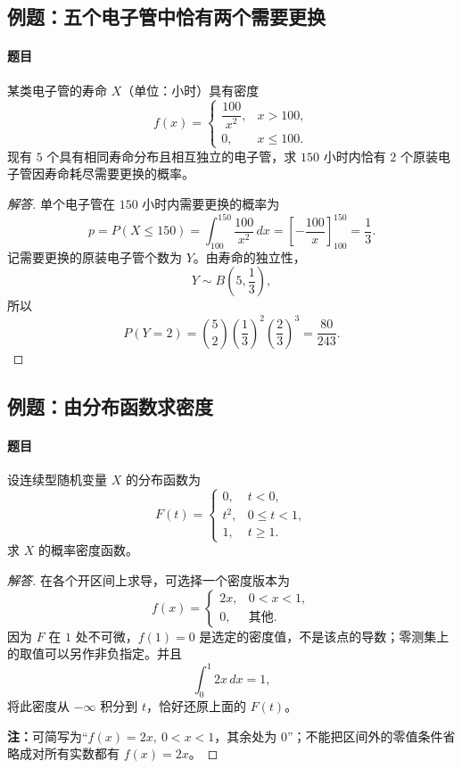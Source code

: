 \subsection{例题：五个电子管中恰有两个需要更换}\label{note:c2:e11}
\paragraph{题目}
某类电子管的寿命 $X$（单位：小时）具有密度
\[
f(x)=
\begin{cases}
\dfrac{100}{x^2},&x>100,\\[0.4em]
0,&x\leq100.
\end{cases}
\]
现有 $5$ 个具有相同寿命分布且相互独立的电子管，求 $150$ 小时内恰有 $2$ 个原装电子管因寿命耗尽需要更换的概率。

\begin{proof}[解答]
单个电子管在 $150$ 小时内需要更换的概率为
\[
p=P(X\leq150)
=\int_{100}^{150}\frac{100}{x^2}\,dx
=\left[-\frac{100}{x}\right]_{100}^{150}
=\frac13.
\]
记需要更换的原装电子管个数为 $Y$。由寿命的独立性，
\[
Y\sim B\left(5,\frac13\right),
\]
所以
\[
P(Y=2)=\binom52\left(\frac13\right)^2
\left(\frac23\right)^3=\frac{80}{243}.
\]
\end{proof}

\subsection{例题：由分布函数求密度}\label{note:c2:e12}
\paragraph{题目}
设连续型随机变量 $X$ 的分布函数为
\[
F(t)=
\begin{cases}
0,&t<0,\\
t^2,&0\leq t<1,\\
1,&t\geq1.
\end{cases}
\]
求 $X$ 的概率密度函数。

\begin{proof}[解答]
在各个开区间上求导，可选择一个密度版本为
\[
f(x)=
\begin{cases}
2x,&0<x<1,\\
0,&\text{其他}.
\end{cases}
\]
因为 $F$ 在 $1$ 处不可微，$f(1)=0$ 是选定的密度值，不是该点的导数；零测集上的取值可以另作非负指定。并且
\[
\int_0^1 2x\,dx=1,
\]
将此密度从 $-\infty$ 积分到 $t$，恰好还原上面的 $F(t)$。

\textbf{注：}\quad 可简写为“$f(x)=2x,\ 0<x<1$，其余处为 $0$”；不能把区间外的零值条件省略成对所有实数都有 $f(x)=2x$。
\end{proof}

